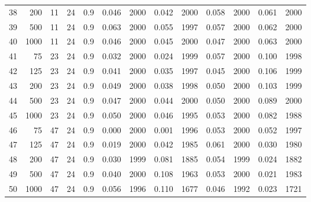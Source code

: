 \documentclass{article}
\begin{document}
\begin{table}[ht]
\begin{center}
\begin{tabular}{rrrrrrrrrrrrr}
  38 & 200 & 11 & 24 & 0.9 & 0.046 & 2000 & 0.042 & 2000 & 0.058 & 2000 & 0.061 & 2000 \\ 
  39 & 500 & 11 & 24 & 0.9 & 0.063 & 2000 & 0.055 & 1997 & 0.057 & 2000 & 0.062 & 2000 \\ 
  40 & 1000 & 11 & 24 & 0.9 & 0.046 & 2000 & 0.045 & 2000 & 0.047 & 2000 & 0.063 & 2000 \\ 
   \hline
41 & 75 & 23 & 24 & 0.9 & 0.032 & 2000 & 0.024 & 1999 & 0.057 & 2000 & 0.100 & 1998 \\ 
  42 & 125 & 23 & 24 & 0.9 & 0.041 & 2000 & 0.035 & 1997 & 0.045 & 2000 & 0.106 & 1999 \\ 
  43 & 200 & 23 & 24 & 0.9 & 0.049 & 2000 & 0.038 & 1998 & 0.050 & 2000 & 0.103 & 1999 \\ 
  44 & 500 & 23 & 24 & 0.9 & 0.047 & 2000 & 0.044 & 2000 & 0.050 & 2000 & 0.089 & 2000 \\ 
  45 & 1000 & 23 & 24 & 0.9 & 0.050 & 2000 & 0.046 & 1995 & 0.053 & 2000 & 0.082 & 1988 \\ 
   \hline
46 & 75 & 47 & 24 & 0.9 & 0.000 & 2000 & 0.001 & 1996 & 0.053 & 2000 & 0.052 & 1997 \\ 
  47 & 125 & 47 & 24 & 0.9 & 0.019 & 2000 & 0.042 & 1985 & 0.061 & 2000 & 0.030 & 1980 \\ 
  48 & 200 & 47 & 24 & 0.9 & 0.030 & 1999 & 0.081 & 1885 & 0.054 & 1999 & 0.024 & 1882 \\ 
  49 & 500 & 47 & 24 & 0.9 & 0.040 & 2000 & 0.108 & 1963 & 0.053 & 2000 & 0.021 & 1983 \\ 
  50 & 1000 & 47 & 24 & 0.9 & 0.056 & 1996 & 0.110 & 1677 & 0.046 & 1992 & 0.023 & 1721 \\ 
   \hline
\end{tabular}
\end{center}
\end{table}
\end{document}
